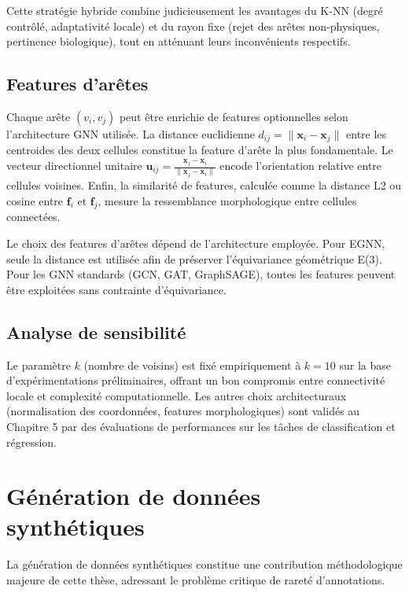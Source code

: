Cette stratégie hybride combine judicieusement les avantages du K-NN (degré contrôlé, adaptativité locale) et du rayon fixe (rejet des arêtes non-physiques, pertinence biologique), tout en atténuant leurs inconvénients respectifs.

\subsection{Features d'arêtes}

Chaque arête $(v_i, v_j)$ peut être enrichie de features optionnelles selon l'architecture GNN utilisée. La distance euclidienne $d_{ij} = \|\mathbf{x}_i - \mathbf{x}_j\|$ entre les centroides des deux cellules constitue la feature d'arête la plus fondamentale. Le vecteur directionnel unitaire $\mathbf{u}_{ij} = \frac{\mathbf{x}_j - \mathbf{x}_i}{\|\mathbf{x}_j - \mathbf{x}_i\|}$ encode l'orientation relative entre cellules voisines. Enfin, la similarité de features, calculée comme la distance L2 ou cosine entre $\mathbf{f}_i$ et $\mathbf{f}_j$, mesure la ressemblance morphologique entre cellules connectées.

Le choix des features d'arêtes dépend de l'architecture employée. Pour EGNN, seule la distance est utilisée afin de préserver l'équivariance géométrique E(3). Pour les GNN standards (GCN, GAT, GraphSAGE), toutes les features peuvent être exploitées sans contrainte d'équivariance.

\subsection{Analyse de sensibilité}

Le paramètre $k$ (nombre de voisins) est fixé empiriquement à $k=10$ sur la base d'expérimentations préliminaires, offrant un bon compromis entre connectivité locale et complexité computationnelle. Les autres choix architecturaux (normalisation des coordonnées, features morphologiques) sont validés au Chapitre 5 par des évaluations de performances sur les tâches de classification et régression.

\section{Génération de données synthétiques}

La génération de données synthétiques constitue une contribution méthodologique majeure de cette thèse, adressant le problème critique de rareté d'annotations.

